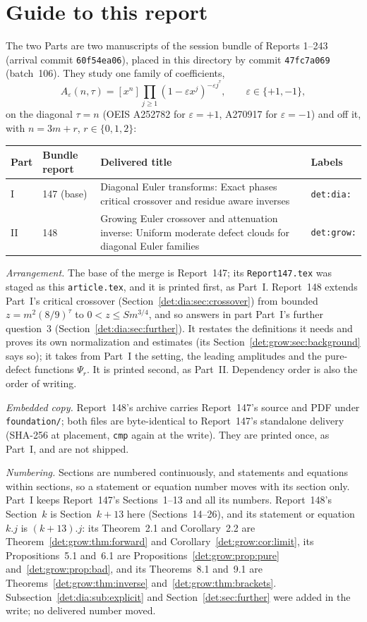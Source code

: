 \documentclass[11pt,letterpaper]{article}
\numberwithin{equation}{section}
\theoremstyle{definition}\newtheorem{definition}[theorem]{Definition}
\theoremstyle{remark}\newtheorem{remark}[theorem]{Remark}
\newcommand{\eps}{\varepsilon}
\newcommand{\file}[1]{\nolinkurl{#1}}
\begin{document}
\section*{Guide to this report}\label{det:sec:guide}
The two Parts are two manuscripts of the session bundle of Reports 1--243 (arrival commit \texttt{60f54ea06}), placed in this directory by commit \texttt{47fc7a069} (batch~106). They study one family of coefficients,
\[
 A_\eps(n,\tau)=[x^n]\prod_{j\ge1}(1-\eps x^j)^{-\eps j^\tau},\qquad \eps\in\{+1,-1\},
\]
on the diagonal $\tau=n$ (OEIS A252782 for $\eps=+1$, A270917 for $\eps=-1$) and off it, with $n=3m+r$, $r\in\{0,1,2\}$:
\begin{center}
\small
\begin{tabular}{@{}l l >{\raggedright\arraybackslash}p{} l@{}}
\toprule
Part & Bundle report & Delivered title & Labels\\
\midrule
I & 147 (base) & Diagonal Euler transforms: Exact phases critical crossover and residue aware inverses & \texttt{det:dia:}\\
II & 148 & Growing Euler crossover and attenuation inverse: Uniform moderate defect clouds for diagonal Euler families & \texttt{det:grow:}\\
\bottomrule
\end{tabular}
\end{center}
\emph{Arrangement.} The base of the merge is Report~147; its \file{Report147.tex} was staged as this \file{article.tex}, and it is printed first, as Part~I. Report~148 extends Part~I's critical crossover (Section~\ref{det:dia:sec:crossover}) from bounded $z=m^2(8/9)^\tau$ to $0<z\le Sm^{3/4}$, and so answers in part Part~I's further question~3 (Section~\ref{det:dia:sec:further}). It restates the definitions it needs and proves its own normalization and estimates (its Section~\ref{det:grow:sec:background} says so); it takes from Part~I the setting, the leading amplitudes and the pure-defect functions $\Psi_r$. It is printed second, as Part~II. Dependency order is also the order of writing.

\emph{Embedded copy.} Report~148's archive carries Report~147's source and PDF under \file{foundation/}; both files are byte-identical to Report~147's standalone delivery (SHA-256 at placement, \texttt{cmp} again at the write). They are printed once, as Part~I, and are not shipped.

\emph{Numbering.} Sections are numbered continuously, and statements and equations within sections, so a statement or equation number moves with its section only. Part~I keeps Report~147's Sections~1--13 and all its numbers. Report~148's Section~$k$ is Section~$k+13$ here (Sections~14--26), and its statement or equation $k.j$ is $(k+13).j$: its Theorem~2.1 and Corollary~2.2 are Theorem~\ref{det:grow:thm:forward} and Corollary~\ref{det:grow:cor:limit}, its Propositions~5.1 and~6.1 are Propositions~\ref{det:grow:prop:pure} and~\ref{det:grow:prop:bad}, and its Theorems~8.1 and~9.1 are Theorems~\ref{det:grow:thm:inverse} and~\ref{det:grow:thm:brackets}. Subsection~\ref{det:dia:sub:explicit} and Section~\ref{det:sec:further} were added in the write; no delivered number moved.
\end{document}
